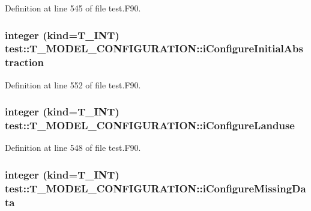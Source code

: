 Definition at line 545 of file test.F90.

\hypertarget{typetest_1_1_t___m_o_d_e_l___c_o_n_f_i_g_u_r_a_t_i_o_n_a8b8c3341923c6ee77cc8ae4ef6222bf2}{
\subsubsection[{iConfigureInitialAbstraction}]{\setlength{\rightskip}{0pt plus 5cm}integer (kind={\bf T\_\-INT}) {\bf test::T\_\-MODEL\_\-CONFIGURATION::iConfigureInitialAbstraction}}}
\label{typetest_1_1_t___m_o_d_e_l___c_o_n_f_i_g_u_r_a_t_i_o_n_a8b8c3341923c6ee77cc8ae4ef6222bf2}


Definition at line 552 of file test.F90.

\hypertarget{typetest_1_1_t___m_o_d_e_l___c_o_n_f_i_g_u_r_a_t_i_o_n_a52f14853971b661ad49e682e51bfa66c}{
\subsubsection[{iConfigureLanduse}]{\setlength{\rightskip}{0pt plus 5cm}integer (kind={\bf T\_\-INT}) {\bf test::T\_\-MODEL\_\-CONFIGURATION::iConfigureLanduse}}}
\label{typetest_1_1_t___m_o_d_e_l___c_o_n_f_i_g_u_r_a_t_i_o_n_a52f14853971b661ad49e682e51bfa66c}


Definition at line 548 of file test.F90.

\hypertarget{typetest_1_1_t___m_o_d_e_l___c_o_n_f_i_g_u_r_a_t_i_o_n_a2ba188b01d8c0f5653dc0f2c0a6d6722}{
\subsubsection[{iConfigureMissingData}]{\setlength{\rightskip}{0pt plus 5cm}integer (kind={\bf T\_\-INT}) {\bf test::T\_\-MODEL\_\-CONFIGURATION::iConfigureMissingData}}}
\label{typetest_1_1_t___m_o_d_e_l___c_o_n_f_i_g_u_r_a_t_i_o_n_a2ba188b01d8c0f5653dc0f2c0a6d6722}


